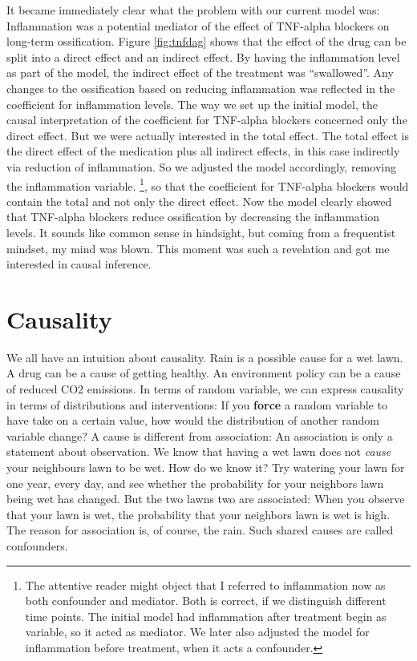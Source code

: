 \documentclass[
  10pt,
]{scrbook}
\begin{document}
It became immediately clear what the problem with our current model was:
Inflammation was a potential mediator of the effect of TNF-alpha blockers on long-term ossification.
Figure \ref{fig:tnfdag} shows that the effect of the drug can be split into a direct effect and an indirect effect.
By having the inflammation level as part of the model, the indirect effect of the treatment was ``swallowed''.
Any changes to the ossification based on reducing inflammation was reflected in the coefficient for inflammation levels.
The way we set up the initial model, the causal interpretation of the coefficient for TNF-alpha blockers concerned only the direct effect.
But we were actually interested in the total effect.
The total effect is the direct effect of the medication plus all indirect effects, in this case indirectly via reduction of inflammation.
So we adjusted the model accordingly, removing the inflammation variable. \footnote{The attentive reader might object that I referred to inflammation now as both confounder and mediator. Both is correct, if we distinguish different time points. The initial model had inflammation after treatment begin as variable, so it acted as mediator. We later also adjusted the model for inflammation before treatment, when it acts a confounder.}, so that the coefficient for TNF-alpha blockers would contain the total and not only the direct effect.
Now the model clearly showed that TNF-alpha blockers reduce ossification by decreasing the inflammation levels.
It sounds like common sense in hindsight, but coming from a frequentist mindset, my mind was blown.
This moment was such a revelation and got me interested in causal inference.

\hypertarget{causality}{%
\section{Causality}\label{causality}}

We all have an intuition about causality.
Rain is a possible cause for a wet lawn.
A drug can be a cause of getting healthy.
An environment policy can be a cause of reduced CO2 emissions.
In terms of random variable, we can express causality in terms of distributions and interventions:
If you \textbf{force} a random variable to have take on a certain value, how would the distribution of another random variable change?
A cause is different from association:
An association is only a statement about observation.
We know that having a wet lawn does not \emph{cause} your neighbours lawn to be wet.
How do we know it? Try watering your lawn for one year, every day, and see whether the probability for your neighbors lawn being wet has changed.
But the two lawns two are associated:
When you observe that your lawn is wet, the probability that your neighbors lawn is wet is high.
The reason for association is, of course, the rain.
Such shared causes are called confounders.
\end{document}
